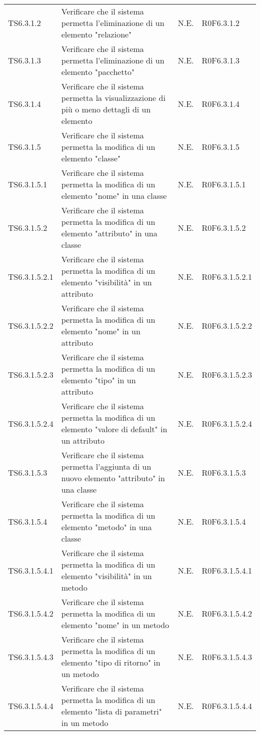 \begin{longtable}{p{2.5cm}!{\VRule[1pt]}p{6.5cm}!{\VRule[1pt]}p{1cm}!{\VRule[1pt]}p{3cm}}
TS6.3.1.2 & Verificare che il sistema permetta l'eliminazione di un elemento "relazione" & N.E. & R0F6.3.1.2\\
TS6.3.1.3 & Verificare che il sistema permetta l'eliminazione di un elemento "pacchetto" & N.E. & R0F6.3.1.3\\
TS6.3.1.4 & Verificare che il sistema permetta la visualizzazione di più o meno dettagli di un elemento & N.E. & R0F6.3.1.4\\
TS6.3.1.5 & Verificare che il sistema permetta la modifica di un elemento "classe" & N.E. & R0F6.3.1.5\\
TS6.3.1.5.1 & Verificare che il sistema permetta la modifica di un elemento "nome" in una classe & N.E. & R0F6.3.1.5.1\\
TS6.3.1.5.2 & Verificare che il sistema permetta la modifica di un elemento "attributo" in una classe & N.E. & R0F6.3.1.5.2\\
TS6.3.1.5.2.1 & Verificare che il sistema permetta la modifica di un elemento "visibilità" in un attributo & N.E. & R0F6.3.1.5.2.1\\
TS6.3.1.5.2.2 & Verificare che il sistema permetta la modifica di un elemento "nome" in un attributo & N.E. & R0F6.3.1.5.2.2\\
TS6.3.1.5.2.3 & Verificare che il sistema permetta la modifica di un elemento "tipo" in un attributo & N.E. & R0F6.3.1.5.2.3\\
TS6.3.1.5.2.4 & Verificare che il sistema permetta la modifica di un elemento "valore di default" in un attributo & N.E. & R0F6.3.1.5.2.4\\
TS6.3.1.5.3 & Verificare che il sistema permetta l'aggiunta di un nuovo elemento "attributo" in una classe & N.E. & R0F6.3.1.5.3\\
TS6.3.1.5.4 & Verificare che il sistema permetta la modifica di un elemento "metodo" in una classe & N.E. & R0F6.3.1.5.4\\
TS6.3.1.5.4.1 & Verificare che il sistema permetta la modifica di un elemento "visibilità" in un metodo & N.E. & R0F6.3.1.5.4.1\\
TS6.3.1.5.4.2 & Verificare che il sistema permetta la modifica di un elemento "nome" in un metodo & N.E. & R0F6.3.1.5.4.2\\
TS6.3.1.5.4.3 & Verificare che il sistema permetta la modifica di un elemento "tipo di ritorno" in un metodo & N.E. & R0F6.3.1.5.4.3\\
TS6.3.1.5.4.4 & Verificare che il sistema permetta la modifica di un elemento "lista di parametri" in un metodo & N.E. & R0F6.3.1.5.4.4\\

\end{longtable}

